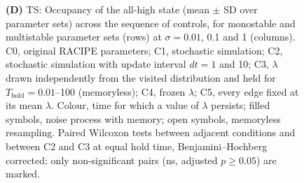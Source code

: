 \documentclass[11pt]{article}
\providecommand{\DIFaddtex}[1]{{\protect\color{red}#1}} %
\providecommand{\DIFdeltex}[1]{} %
\providecommand{\DIFaddFL}[1]{\DIFadd{#1}} %
\providecommand{\DIFdelFL}[1]{\DIFdel{#1}} %
\providecommand{\DIFaddbeginFL}{} %
\providecommand{\DIFaddendFL}{} %
\providecommand{\DIFdelbeginFL}{} %
\providecommand{\DIFdelendFL}{} %
\providecommand{\DIFadd}[1]{\texorpdfstring{\DIFaddtex{#1}}{#1}} %
\providecommand{\DIFdel}[1]{\texorpdfstring{\DIFdeltex{#1}}{}} %
\providecommand{\DIFaddincludegraphics}[2][]{\DIFOincludegraphics[#1]{#2}} %
\providecommand{\DIFdelincludegraphics}[2][]{}
\DeclareRobustCommand{\DIFaddbeginFL}{\DIFOaddbeginFL \let\includegraphics\DIFaddincludegraphics} %
\DeclareRobustCommand{\DIFaddendFL}{\DIFOaddendFL \let\includegraphics\DIFOincludegraphics} %
\DeclareRobustCommand{\DIFdelbeginFL}{\DIFOdelbeginFL \let\includegraphics\DIFdelincludegraphics} %
\DeclareRobustCommand{\DIFdelendFL}{\DIFOaddendFL \let\includegraphics\DIFOincludegraphics} %
\begin{document}
\begin{figure}
{    \textbf{(D)} \DIFdelbeginFL \DIFdelFL{All-high-state MRT }\DIFdelendFL \DIFaddbeginFL \DIFaddFL{TS: Occupancy of the all-high state }\DIFaddendFL (mean $\pm$ SD over \DIFdelbeginFL \DIFdelFL{all }\DIFdelendFL \DIFaddbeginFL \DIFaddFL{parameter sets) across the sequence of controls, for }\DIFaddendFL monostable and multistable parameter sets \DIFaddbeginFL \DIFaddFL{(rows}\DIFaddendFL ) \DIFdelbeginFL \DIFdelFL{for TS}\DIFdelendFL \DIFaddbeginFL \DIFaddFL{at $\sigma = 0.01$}\DIFaddendFL , \DIFdelbeginFL \DIFdelFL{TSSA}\DIFdelendFL \DIFaddbeginFL \DIFaddFL{0.1 and 1 (columns). C0}\DIFaddendFL , \DIFdelbeginFL \DIFdelFL{TT}\DIFdelendFL \DIFaddbeginFL \DIFaddFL{original RACIPE parameters; C1}\DIFaddendFL , \DIFaddbeginFL \DIFaddFL{stochastic simulation; C2, stochastic simulation with update interval $dt = 1$ }\DIFaddendFL and \DIFdelbeginFL \DIFdelFL{TTSA}\DIFdelendFL \DIFaddbeginFL \DIFaddFL{10; C3}\DIFaddendFL , \DIFdelbeginFL \DIFdelFL{comparing }\DIFdelendFL \DIFaddbeginFL \DIFaddFL{$\lambda$ drawn independently from }\DIFaddendFL the \DIFdelbeginFL \DIFdelFL{original point-}\DIFdelendFL \DIFaddbeginFL \DIFaddFL{visited distribution and held for $T_\text{hold} = 0.01$--100 (memoryless); C4, frozen }\DIFaddendFL $\lambda$\DIFdelbeginFL \DIFdelFL{deterministic run}\DIFdelendFL \DIFaddbeginFL \DIFaddFL{; C5}\DIFaddendFL , \DIFdelbeginFL \DIFdelFL{the }\DIFdelendFL \DIFaddbeginFL \DIFaddFL{every edge fixed at its mean }\DIFaddendFL $\lambda$\DIFdelbeginFL \DIFdelFL{-resampled deterministic run}\DIFdelendFL \DIFaddbeginFL \DIFaddFL{. Colour}\DIFaddendFL , \DIFaddbeginFL \DIFaddFL{time for which a value of $\lambda$ persists; filled symbols, noise process with memory; open symbols, memoryless resampling. Paired Wilcoxon tests between adjacent conditions }\DIFaddendFL and \DIFdelbeginFL \DIFdelFL{the full stochastic simulation}\DIFdelendFL \DIFaddbeginFL \DIFaddFL{between C2 and C3 at equal hold time, Benjamini--Hochberg corrected}\DIFaddendFL ; \DIFdelbeginFL \DIFdelFL{faceted by stability class of the }\DIFdelendFL \DIFaddbeginFL \DIFaddFL{only non-significant pairs (ns, adjusted $p \geq 0.05$) are marked.
}}
\end{figure}
\end{document}
